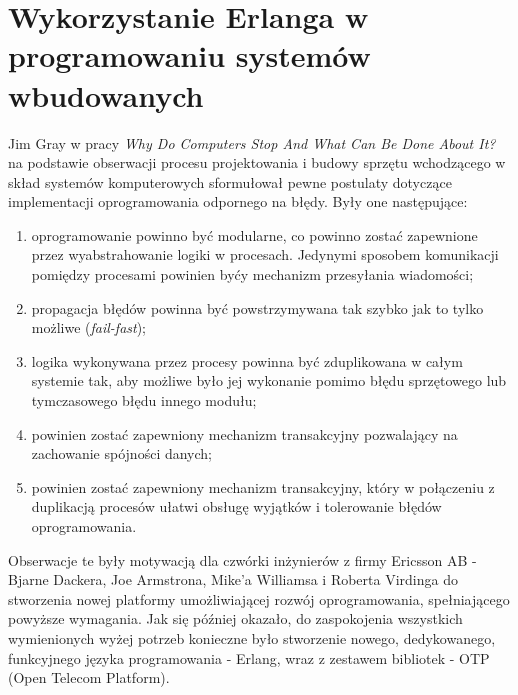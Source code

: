 
\section{Wykorzystanie Erlanga w programowaniu systemów wbudowanych}
\label{sec:jezykiFunkcyjne}

Jim Gray w pracy \emph{Why Do Computers Stop And What Can Be Done About It?} \cite{Gray85whydo} na podstawie obserwacji procesu projektowania i budowy sprzętu wchodzącego w skład systemów komputerowych sformułował pewne postulaty dotyczące implementacji oprogramowania odpornego na błędy.
Były one następujące:
\begin{enumerate}
\item oprogramowanie powinno być modularne, co powinno zostać zapewnione przez wyabstrahowanie logiki w procesach. Jedynymi sposobem komunikacji pomiędzy procesami powinien byćy mechanizm przesyłania wiadomości;
\item propagacja błędów powinna być powstrzymywana tak szybko jak to tylko możliwe (\emph{fail-fast});
\item logika wykonywana przez procesy powinna być zduplikowana w całym systemie tak, aby możliwe było jej wykonanie pomimo błędu sprzętowego lub tymczasowego błędu innego modułu;
\item powinien zostać zapewniony mechanizm transakcyjny pozwalający na zachowanie spójności danych;
\item powinien zostać zapewniony mechanizm transakcyjny, który w połączeniu z duplikacją procesów ułatwi obsługę wyjątków i tolerowanie błędów oprogramowania.
\end{enumerate}

Obserwacje te były motywacją dla czwórki inżynierów z firmy Ericsson AB - Bjarne Dackera, Joe Armstrona, Mike'a Williamsa i Roberta Virdinga do stworzenia nowej platformy umożliwiającej rozwój oprogramowania, spełniającego powyższe wymagania.
Jak się później okazało, do zaspokojenia wszystkich wymienionych wyżej potrzeb konieczne było stworzenie nowego, dedykowanego, funkcyjnego języka programowania - Erlang, wraz z zestawem bibliotek - OTP (Open Telecom Platform).

